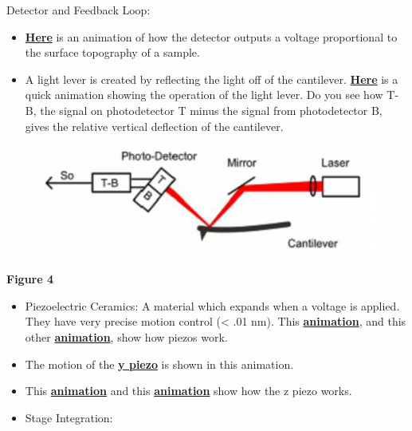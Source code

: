 \documentclass{../lab}
\begin{document}
Detector and Feedback Loop:

\begin{itemize}
    \item \href{http://experimentationlab.berkeley.edu/sites/default/files/AFMImages/2.1.\%20photodetector.flv\_converted.mp4}{\textbf{Here}} is an animation of how the detector outputs a voltage proportional to the surface topography of a sample.

    \item A light lever is created by reflecting the light off of the cantilever.  \href{http://experimentationlab.berkeley.edu/sites/default/files/AFMImages/2.3.\%20Light\%20Lever.flv\_converted.mp4}{\textbf{Here}} is a quick animation showing the operation of the light lever. Do you see how T-B, the signal on photodetector T minus the signal from photodetector B, gives the relative vertical deflection of the cantilever.

\end{itemize}


\begin{figure}[h]
    \centering
    \href{http://dev-physicsadv.pantheon.berkeley.edu/sites/default/files/AFMImages/AFMlasermirror.png}{\includegraphics[width=0.5\linewidth]{images/AFMlasermirror.png}}
    \caption{}
    \label{fig:AFMlasermirror}
\end{figure}

\textbf{Figure 4}

\begin{itemize}
    \item Piezoelectric Ceramics:  A material which expands when a voltage is applied.  They have very precise motion control (< .01 nm).  This \href{http://experimentationlab.berkeley.edu/sites/default/files/AFMImages/3.1.\%20Motion.flv\_converted.mp4}{\textbf{animation}}, and this other \href{http://experimentationlab.berkeley.edu/sites/default/files/AFMImages/3.2.\%20proportional.flv\_converted.mp4}{\textbf{animation}}, show how piezos work.

    \item The motion of the \href{http://experimentationlab.berkeley.edu/sites/default/files/AFMImages/3.3.\%20Y\%20Scanner\_converted.mp4}{\textbf{y piezo}} is shown in this animation.

    \item This \href{http://experimentationlab.berkeley.edu/sites/default/files/AFMImages/3.4.\%20Z\%20Scanner.flv\_converted.mp4}{\textbf{animation}} and this\textbf{ }\href{http://experimentationlab.berkeley.edu/sites/default/files/AFMImages/4.1.\%20Z\%20motion.flv\_converted.mp4}{\textbf{animation}} show how the z piezo works.

    \item Stage Integration:

\end{itemize}
\end{document}
